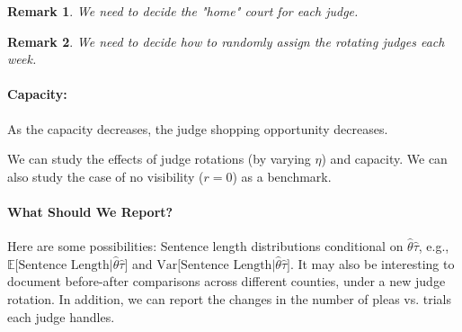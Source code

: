 \documentclass[11pt, oneside]{article}   	%
\theoremstyle{ModifiedStyle}
\newtheorem{remark}{Remark}
\begin{document}
		\begin{remark}
			We need to decide the "home" court for each judge.
		\end{remark}

		\begin{remark}
			We need to decide how to randomly assign the rotating judges each week.
		\end{remark}

		\paragraph{Capacity:} As the capacity decreases, the judge shopping opportunity decreases.

		We can study the effects of judge rotations (by varying $\eta$) and capacity. We can also study the case of no visibility ($r=0$) as a benchmark.


		\vspace{-3mm}
		\paragraph{What Should We Report?} Here are some possibilities: Sentence length distributions conditional
		on $\hat{\theta}\hat{\tau}$, e.g., $\mathbb{E}\big[ \text{Sentence Length}\big| \hat{\theta}\hat{\tau} \big]$ and $\text{Var}\big[ \text{Sentence Length}\big| \hat{\theta}\hat{\tau} \big]$. It may also be interesting to document before-after comparisons across different counties, under a new judge rotation. In addition, we can report the changes in the number of pleas vs. trials each judge handles.




\clearpage
\appendix
\end{document}
